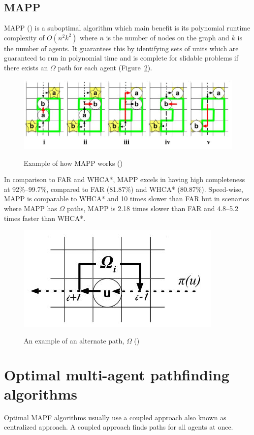\documentclass[a4paper,11pt]{article}
\begin{document}
\subsection{MAPP}
MAPP (\cite{wang2011mapp}) is a suboptimal algorithm which main benefit is its polynomial runtime complexity of $O(n^2k^2)$ where $n$ is the number of nodes on the graph and $k$ is the number of agents. It guarantees this by identifying sets of units which are guaranteed to run in polynomial time and is complete for slidable problems if there exists an $\Omega$ path for each agent (Figure~\ref{fig:omegapath}).


\begin{figure}[H]
	\centering
	\includegraphics[width=\linewidth]{graphics/mappblank}
	\label{fig:mappblank}
	\caption{Example of how MAPP works (\cite{wang2011mapp})}
\end{figure}

In comparison to FAR and WHCA*, MAPP excels in having high completeness at 92\%--99.7\%, compared to FAR (81.87\%) and WHCA* (80.87\%). Speed-wise, MAPP is comparable to WHCA* and 10 times slower than FAR  but in scenarios where MAPP has $\Omega$ paths, MAPP is 2.18 times slower than FAR and 4.8--5.2 times faster than WHCA*.



\begin{figure}[H]
	\centering
	\includegraphics[width=0.4\linewidth]{graphics/omegapath}
	\label{fig:omegapath}
	\caption{An example of an alternate path, $\Omega$ (\cite{wang2011mapp})}
\end{figure}


\section{Optimal multi-agent pathfinding algorithms} \label{sec:optimal}
Optimal MAPF algorithms usually use a coupled approach also known as centralized approach. A coupled approach finds paths for all agents at once. 
\end{document}
